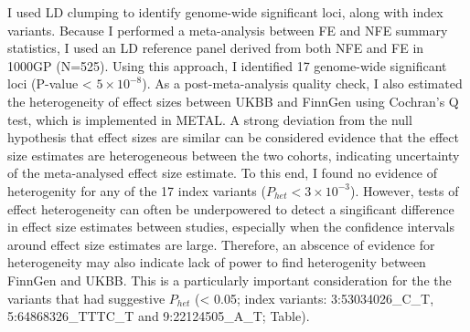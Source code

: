     I used LD clumping to identify genome-wide significant loci, along with index variants. Because I performed a meta-analysis between FE and NFE summary statistics, I used an LD reference panel derived from both NFE and FE in 1000GP (N=525). Using this approach, I identified 17 genome-wide significant loci (P-value < $5\times10^{-8}$). As a post-meta-analysis quality check, I also estimated the heterogeneity of effect sizes between UKBB and FinnGen using Cochran's Q test, which is implemented in METAL. A strong deviation from the null hypothesis that effect sizes are similar can be considered evidence that the effect size estimates are heterogeneous between the two cohorts, indicating uncertainty of the meta-analysed effect size estimate. To this end, I found no evidence of heterogenity for any of the 17 index variants ($P_{het} < 3\times10^{-3}$). However, tests of effect heterogeneity can often be underpowered to detect a singificant difference in effect size estimates between studies, especially when the confidence intervals around effect size estimates are large. Therefore, an abscence of evidence for heterogeneity may also indicate lack of power to find heterogenity between FinnGen and UKBB. This is a particularly important consideration for the the variants that had suggestive $P_{het}$ (< 0.05; index variants: 3:53034026\_C\_T, 5:64868326\_TTTC\_T and 9:22124505\_A\_T; Table). 


